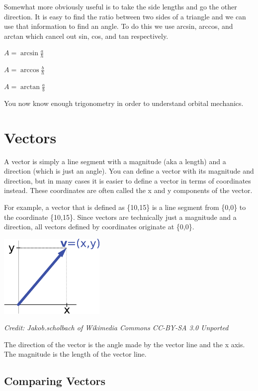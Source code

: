 \documentclass[]{book}
\begin{document}
Somewhat more obviously useful is to take the side lengths and go the other
direction.  It is easy to find the ratio between two sides of a triangle
and we can use that information to find an angle.  To do this we use arcsin,
arccos, and arctan which cancel out sin, cos, and tan respectively.

\bigskip
$A = \arcsin{\frac{a}{h}}$
\bigskip

$A = \arccos{\frac{b}{h}}$
\bigskip

$A = \arctan{\frac{a}{b}}$
\bigskip

You now know enough trigonometry in order to understand orbital mechanics.

\chapter{Vectors}

A vector is simply a line segment with a magnitude (aka a length) and a
direction (which is just an angle).  You can define a vector with its
magnitude and direction, but in many cases it is easier to define a vector
in terms of coordinates instead.  These coordinates are often called the x
and y components of the vector.

For example, a vector that is defined as \{10,15\} is a line segment from
\{0,0\} to the coordinate \{10,15\}.  Since vectors are technically just a
magnitude and a direction, all vectors defined by coordinates originate
at \{0,0\}.

\bigskip
\includegraphics[width=2in]{images/Vector_components}

\textit{Credit: Jakob.scholbach of Wikimedia Commons CC-BY-SA 3.0 Unported}
\bigskip

The direction of the vector is the angle made by the vector line and the
x axis.  The magnitude is the length of the vector line.

\section{Comparing Vectors}
\end{document}
